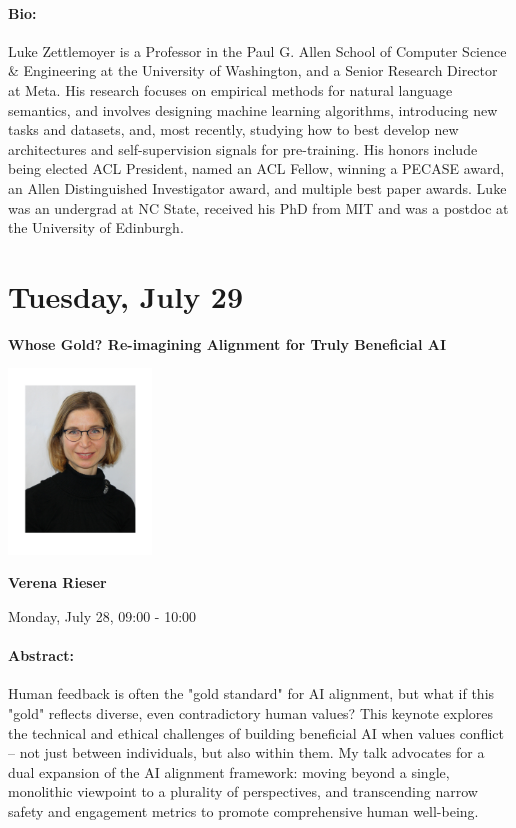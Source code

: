 \paragraph{Bio:}
Luke Zettlemoyer is a Professor in the Paul G. Allen School of Computer Science & Engineering at the University of Washington, and a Senior Research Director at Meta. His research focuses on empirical methods for natural language semantics, and involves designing machine learning algorithms, introducing new tasks and datasets, and, most recently, studying how to best develop new architectures and self-supervision signals for pre-training. His honors include being elected ACL President, named an ACL Fellow, winning a PECASE award, an Allen Distinguished Investigator award, and multiple best paper awards. Luke was an undergrad at NC State, received his PhD from MIT and was a postdoc at the University of Edinburgh.


\clearpage


\section{Tuesday, July 29}


\begin{center}
    {\Large \textbf{Whose Gold? Re-imagining Alignment for Truly Beneficial AI}}
    
    \includegraphics[width=1.5in]{examples/acl25-handbook/invited_talks/Verena.pdf}
    
    {\large \textbf{Verena Rieser}}

    Monday, July 28, 09:00 - 10:00
\end{center}

\paragraph{Abstract:}
Human feedback is often the "gold standard" for AI alignment, but what if this "gold" reflects diverse, even contradictory human values? This keynote explores the technical and ethical challenges of building beneficial AI when values conflict -- not just between individuals, but also within them. My talk advocates for a dual expansion of the AI alignment framework: moving beyond a single, monolithic viewpoint to a plurality of perspectives, and transcending narrow safety and engagement metrics to promote comprehensive human well-being. 

